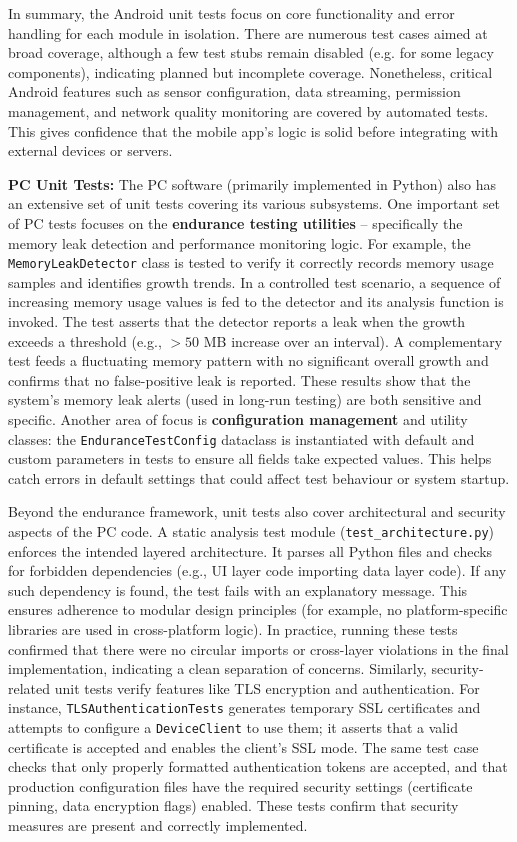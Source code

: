 In summary, the Android unit tests focus on core functionality and error handling for each module in isolation. There are numerous test cases aimed at broad coverage, although a few test stubs remain disabled (e.g. for some legacy components), indicating planned but incomplete coverage. Nonetheless, critical Android features such as sensor configuration, data streaming, permission management, and network quality monitoring are covered by automated tests. This gives confidence that the mobile app's logic is solid before integrating with external devices or servers.

\textbf{PC Unit Tests:} The PC software (primarily implemented in Python) also has an extensive set of unit tests covering its various subsystems. One important set of PC tests focuses on the \textbf{endurance testing utilities} -- specifically the memory leak detection and performance monitoring logic. For example, the \texttt{MemoryLeakDetector} class is tested to verify it correctly records memory usage samples and identifies growth trends. In a controlled test scenario, a sequence of increasing memory usage values is fed to the detector and its analysis function is invoked. The test asserts that the detector reports a leak when the growth exceeds a threshold (e.g., $>50$ MB increase over an interval). A complementary test feeds a fluctuating memory pattern with no significant overall growth and confirms that no false-positive leak is reported. These results show that the system's memory leak alerts (used in long-run testing) are both sensitive and specific. Another area of focus is \textbf{configuration management} and utility classes: the \texttt{EnduranceTestConfig} dataclass is instantiated with default and custom parameters in tests to ensure all fields take expected values. This helps catch errors in default settings that could affect test behaviour or system startup.

Beyond the endurance framework, unit tests also cover architectural and security aspects of the PC code. A static analysis test module (\texttt{test\_architecture.py}) enforces the intended layered architecture. It parses all Python files and checks for forbidden dependencies (e.g., UI layer code importing data layer code). If any such dependency is found, the test fails with an explanatory message. This ensures adherence to modular design principles (for example, no platform-specific libraries are used in cross-platform logic). In practice, running these tests confirmed that there were no circular imports or cross-layer violations in the final implementation, indicating a clean separation of concerns. Similarly, security-related unit tests verify features like TLS encryption and authentication. For instance, \texttt{TLSAuthenticationTests} generates temporary SSL certificates and attempts to configure a \texttt{DeviceClient} to use them; it asserts that a valid certificate is accepted and enables the client's SSL mode. The same test case checks that only properly formatted authentication tokens are accepted, and that production configuration files have the required security settings (certificate pinning, data encryption flags) enabled. These tests confirm that security measures are present and correctly implemented.

